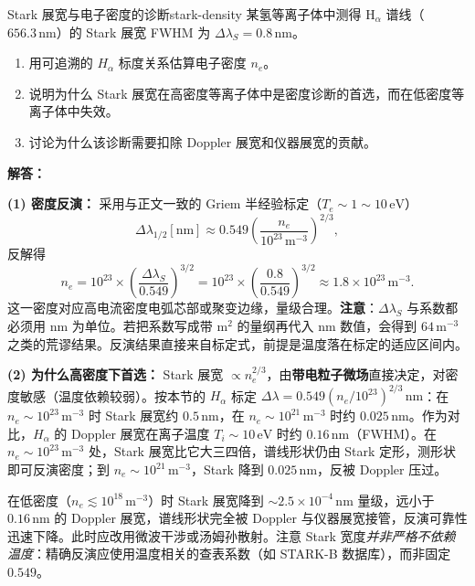 \begin{example}{Stark 展宽与电子密度的诊断}{stark-density}
某氢等离子体中测得 $\mathrm{H}_\alpha$ 谱线（$656.3\,\mathrm{nm}$）的 Stark 展宽 FWHM 为 $\Delta\lambda_S = 0.8\,\mathrm{nm}$。
\begin{enumerate}[label=(\arabic*)]
\item 用可追溯的 $H_\alpha$ 标度关系估算电子密度 $n_e$。
\item 说明为什么 Stark 展宽在高密度等离子体中是密度诊断的首选，而在低密度等离子体中失效。
\item 讨论为什么该诊断需要扣除 Doppler 展宽和仪器展宽的贡献。
\end{enumerate}
\tcblower
\textbf{解答：}

\textbf{(1) 密度反演：} 采用与正文一致的 Griem 半经验标定（$T_e\sim1\sim10\,\mathrm{eV}$）
\[
\Delta\lambda_{1/2}[\mathrm{nm}] \approx 0.549\left(\frac{n_e}{10^{23}\,\mathrm{m^{-3}}}\right)^{2/3},
\]
反解得
\[
n_e = 10^{23}\times\left(\frac{\Delta\lambda_S}{0.549}\right)^{3/2}
= 10^{23}\times\left(\frac{0.8}{0.549}\right)^{3/2}
\approx 1.8\times10^{23}\,\mathrm{m^{-3}}.
\]
这一密度对应高电流密度电弧芯部或聚变边缘，量级合理。\textbf{注意}：$\Delta\lambda_S$ 与系数都必须用 $\mathrm{nm}$ 为单位。若把系数写成带 $\mathrm{m^2}$ 的量纲再代入 $\mathrm{nm}$ 数值，会得到 $64\,\mathrm{m^{-3}}$ 之类的荒谬结果。反演结果直接来自标定式，前提是温度落在标定的适应区间内。

\textbf{(2) 为什么高密度下首选：} Stark 展宽 $\propto n_e^{2/3}$，由\textbf{带电粒子微场}直接决定，对密度敏感（温度依赖较弱）。按本节的 $H_\alpha$ 标定 $\Delta\lambda=0.549(n_e/10^{23})^{2/3}\,\mathrm{nm}$：在 $n_e\sim10^{23}\,\mathrm{m^{-3}}$ 时 Stark 展宽约 $0.5\,\mathrm{nm}$，在 $n_e\sim10^{21}\,\mathrm{m^{-3}}$ 时约 $0.025\,\mathrm{nm}$。作为对比，$H_\alpha$ 的 Doppler 展宽在离子温度 $T_i\sim10\,\mathrm{eV}$ 时约 $0.16\,\mathrm{nm}$（FWHM）。在 $n_e\sim10^{23}\,\mathrm{m^{-3}}$ 处，Stark 展宽比它大三四倍，谱线形状仍由 Stark 定形，测形状即可反演密度；到 $n_e\sim10^{21}\,\mathrm{m^{-3}}$，Stark 降到 $0.025\,\mathrm{nm}$，反被 Doppler 压过。

在低密度（$n_e\lesssim10^{18}\,\mathrm{m^{-3}}$）时 Stark 展宽降到 $\sim2.5\times10^{-4}\,\mathrm{nm}$ 量级，远小于 $0.16\,\mathrm{nm}$ 的 Doppler 展宽，谱线形状完全被 Doppler 与仪器展宽接管，反演可靠性迅速下降。此时应改用微波干涉或汤姆孙散射。注意 Stark 宽度\emph{并非严格不依赖温度}：精确反演应使用温度相关的查表系数（如 STARK-B 数据库），而非固定 $0.549$。


\end{example}
